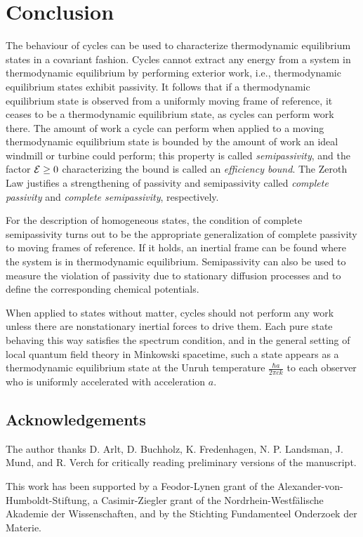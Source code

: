 \documentclass[a4paper,11pt]{article}
\def\E{{\cal E}}
\begin{document}
\section{Conclusion}\label{conclusion}

The behaviour of cycles can be used to characterize thermodynamic
equilibrium states in a covariant fashion.  Cycles
cannot extract any energy from a
system in thermodynamic equilibrium
by performing exterior work, i.e., thermodynamic equilibrium states
exhibit passivity. It
follows that if a thermodynamic equilibrium state is observed from a
uniformly moving frame of reference, it ceases to be a thermodynamic
equilibrium state, as cycles can perform work there. The amount of work
a cycle can perform when applied to a moving thermodynamic equilibrium
state is bounded by the amount of work an ideal windmill or turbine
could perform; this property is called {\em semipassivity}, and the
factor $\E\geq0$ characterizing the bound is called an {\em efficiency
bound}. The Zeroth Law justifies a strengthening of passivity and
semipassivity called {\em complete passivity} and {\em complete
semipassivity}, respectively.

For the description of homogeneous states, the condition of complete
semipassivity turns out to be the appropriate generalization of
complete passivity to moving frames of reference. If it holds, an
inertial frame can be found where the system is in thermodynamic
equilibrium. Semipassivity can also be used to measure the violation
of passivity due to stationary diffusion processes and to define
the corresponding chemical potentials.

When applied to states without matter, cycles should
not perform any work unless there are nonstationary
inertial forces to drive them. Each pure state behaving
this way satisfies the spectrum condition, and in the general
setting of local quantum field theory in Minkowski spacetime,
such a state appears as a thermodynamic equilibrium state at the
Unruh temperature $\frac{\hbar a}{2\pi ck}$ to each
observer who is uniformly accelerated with acceleration $a$.


\subsection*{Acknowledgements}
The author thanks D. Arlt, D. Buchholz, K. Fredenhagen, N. P.
Landsman, J. Mund, and R. Verch for critically reading
preliminary versions of the manuscript.

This work has been supported by a Feodor-Lynen grant of the
Alexander-von-Humboldt-Stiftung, a Casimir-Ziegler grant of
the Nordrhein-Westf\"ali\-sche Akademie der Wissenschaften, and
by the Stichting Fundamenteel Onderzoek der Materie.
\end{document}
